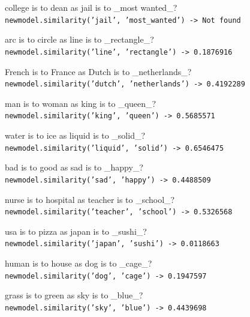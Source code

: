 \documentclass[
	letterpaper, %
]{jdf}
\begin{document}
college is to dean as jail is to \_most wanted\_?\\
\texttt{newmodel.similarity('jail', 'most\_wanted') -> Not found}

\vspace{1em}

arc is to circle as line is to \_rectangle\_?\\
\texttt{newmodel.similarity('line', 'rectangle') -> 0.1876916}

\vspace{1em}

French is to France as Dutch is to \_netherlands\_?\\
\texttt{newmodel.similarity('dutch', 'netherlands') -> 0.4192289}

\vspace{1em}

man is to woman as king is to \_queen\_?\\
\texttt{newmodel.similarity('king', 'queen') -> 0.5685571}

\vspace{1em}

water is to ice as liquid is to \_solid\_?\\
\texttt{newmodel.similarity('liquid', 'solid') -> 0.6546475}

\vspace{1em}

bad is to good as sad is to \_happy\_?\\
\texttt{newmodel.similarity('sad', 'happy') -> 0.4488509}

\vspace{1em}

nurse is to hospital as teacher is to \_school\_?\\
\texttt{newmodel.similarity('teacher', 'school') -> 0.5326568}

\vspace{1em}

usa is to pizza as japan is to \_sushi\_?\\
\texttt{newmodel.similarity('japan', 'sushi') -> 0.0118663}

\vspace{1em}

human is to house as dog is to \_cage\_?\\
\texttt{newmodel.similarity('dog', 'cage') -> 0.1947597}

\vspace{1em}

grass is to green as sky is to \_blue\_?\\
\texttt{newmodel.similarity('sky', 'blue') -> 0.4439698}
\end{document}
